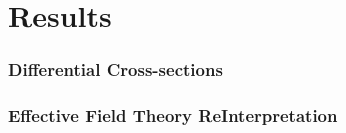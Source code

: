 \part {\LARGE{Results}}
\label{sec:Results}

\section{ Differential Cross-sections }
\label{sec:DifferentialxS}


\section{Effective Field Theory ReInterpretation}
\label{sec:EFT}

